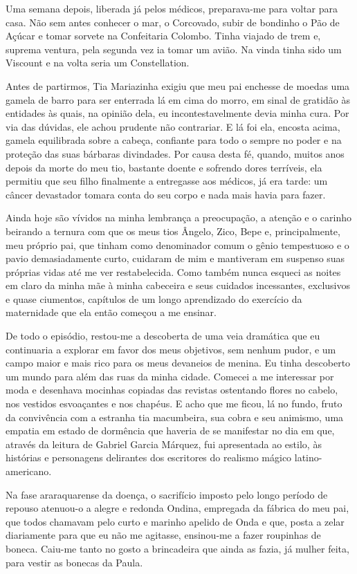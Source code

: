Uma semana depois, liberada já pelos médicos, preparava\hyp{}me para voltar para casa. Não sem antes conhecer o mar, o Corcovado, subir de bondinho o Pão de Açúcar e tomar sorvete na Confeitaria Colombo.
Tinha viajado de trem e, suprema ventura, pela segunda vez ia tomar um avião.
Na vinda tinha sido um Viscount e na volta seria um Constellation.

Antes de partirmos, Tia Mariazinha exigiu que meu pai enchesse de moedas uma gamela de barro para ser enterrada lá em cima do morro, em sinal de gratidão às entidades às quais, na opinião dela, eu incontestavelmente devia minha cura.
Por via das dúvidas, ele achou prudente não contrariar.
E lá foi ela, encosta acima, gamela equilibrada sobre a cabeça, confiante para todo o sempre no poder e na proteção das suas bárbaras divindades.
Por causa desta fé, quando, muitos anos depois da morte do meu tio, bastante doente e sofrendo dores terríveis, ela permitiu que seu filho finalmente a entregasse aos médicos, já era tarde: um câncer devastador tomara conta do seu corpo e nada mais havia para fazer.

Ainda hoje são vívidos na minha lembrança a preocupação, a atenção e o carinho beirando a ternura com que os meus tios Ângelo, Zico, Bepe e, principalmente, meu próprio pai, que tinham como denominador comum o gênio tempestuoso e o pavio demasiadamente curto, cuidaram de mim e mantiveram em suspenso suas próprias vidas até me ver restabelecida.
Como também nunca esqueci as noites em claro da minha mãe à minha cabeceira e seus cuidados incessantes, exclusivos e quase ciumentos, capítulos de um longo aprendizado do exercício da maternidade que ela então começou a me ensinar.

De todo o episódio, restou-me a descoberta de uma veia dramática que eu continuaria a explorar em favor dos meus objetivos, sem nenhum pudor, e um campo maior e mais rico para os meus devaneios de menina.
Eu tinha descoberto um mundo para além das ruas da minha cidade.
Comecei a me interessar por moda e desenhava mocinhas copiadas das revistas ostentando flores no cabelo, nos vestidos esvoaçantes e nos chapéus.
E acho que me ficou, lá no fundo, fruto da convivência com a estranha tia macumbeira, sua cobra e seu animismo, uma empatia em estado de dormência que haveria de se manifestar no dia em que, através da leitura de Gabriel Garcia Márquez, fui apresentada ao estilo, às histórias e personagens delirantes dos escritores do realismo mágico latino-americano.

Na fase araraquarense da doença, o sacrifício imposto pelo longo período de repouso atenuou-o a alegre e redonda Ondina, empregada da fábrica do meu pai, que todos chamavam pelo curto e marinho apelido de Onda e que, posta a zelar diariamente para que eu não me agitasse, ensinou-me a fazer roupinhas de boneca.
Caiu-me tanto no gosto a brincadeira que ainda as fazia, já mulher feita, para vestir as bonecas da Paula.


